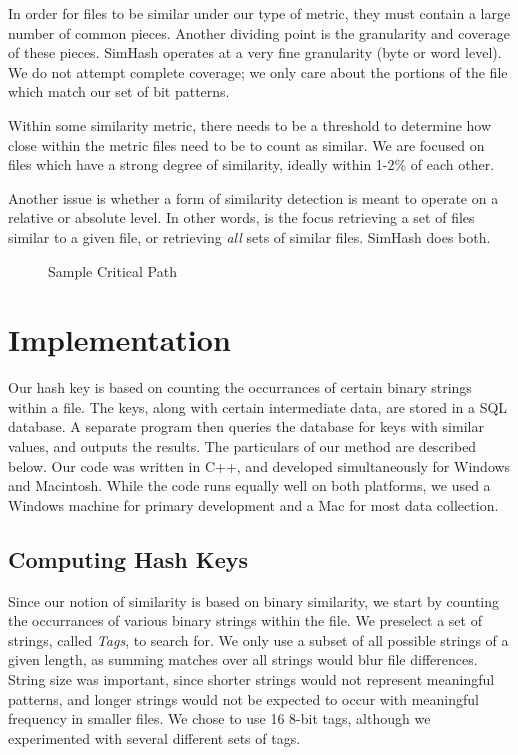 \documentclass[10pt, twocolumn]{article}
\begin{document}
In order for files to be similar under our type of metric, they must contain a large number of common pieces. Another dividing point is the granularity and coverage of these pieces. SimHash operates at a very fine granularity (byte or word level). We do not attempt complete coverage; we only care about the portions of the file which match our set of bit patterns.

Within some similarity metric, there needs to be a threshold to determine how close within the metric files need to be to count as similar. We are focused on files which have a strong degree of similarity, ideally within 1-2\% of each other.

Another issue is whether a form of similarity detection is meant to operate on a relative or absolute level. In other words, is the focus retrieving a set of files similar to a given file, or retrieving \emph{all} sets of similar files. SimHash does both.

 \begin{figure}[h] 
 \centering
\caption{Sample Critical Path}
\label{CritDiag} 
\end{figure}    

\section{Implementation}

Our hash key is based on counting the occurrances of certain binary strings within a file.  The keys, along with certain intermediate data, are stored in a SQL database.  A separate program then queries the database for keys with similar values, and outputs the results.  The particulars of our method are described below.  Our code was written in C++, and developed simultaneously for Windows and Macintosh.  While the code runs equally well on both platforms, we used a Windows machine for primary development and a Mac for most data collection.

\subsection{Computing Hash Keys}

Since our notion of similarity is based on binary similarity, we start by counting the occurrances of various binary strings within the file.  We preselect a set of strings, called {\it Tags}, to search for.  We only use a subset of all possible strings of a given length, as summing matches over all strings would blur file differences.  String size was important, since shorter strings would not represent meaningful patterns, and longer strings would not be expected to occur with meaningful frequency in smaller files.  We chose to use 16 8-bit tags, although we experimented with several different sets of tags.
\end{document}
